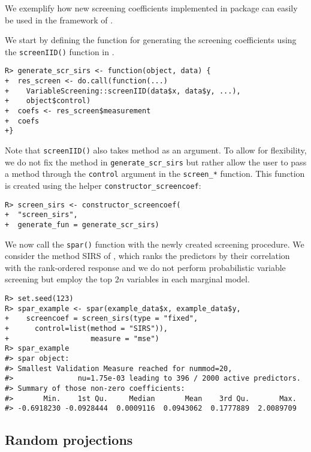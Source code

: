 \documentclass[
  article]{jss}
\begin{document}
We exemplify how new screening coefficients implemented in package
 can easily be used in the framework of
.

We start by defining the function for generating the screening
coefficients using the \texttt{screenIID()} function in
.

\begin{verbatim}
R> generate_scr_sirs <- function(object, data) {
+  res_screen <- do.call(function(...) 
+    VariableScreening::screenIID(data$x, data$y, ...), 
+    object$control)
+  coefs <- res_screen$measurement
+  coefs
+}
\end{verbatim}

Note that \texttt{screenIID()} also takes method as an argument. To
allow for flexibility, we do not fix the method in
\texttt{generate\_scr\_sirs} but rather allow the user to pass a method
through the \texttt{control} argument in the \texttt{screen\_*}
function. This function is created using the helper
\texttt{constructor\_screencoef}:

\begin{verbatim}
R> screen_sirs <- constructor_screencoef(
+  "screen_sirs", 
+  generate_fun = generate_scr_sirs)
\end{verbatim}

We now call the \texttt{spar()} function with the newly created
screening procedure. We consider the method SIRS of
\citet{zhu2011model}, which ranks the predictors by their correlation
with the rank-ordered response and we do not perform probabilistic
variable screening but employ the top \(2n\) variables in each marginal
model.

\begin{verbatim}
R> set.seed(123)      
R> spar_example <- spar(example_data$x, example_data$y,
+    screencoef = screen_sirs(type = "fixed",
+      control=list(method = "SIRS")),
+                   measure = "mse")
R> spar_example
#> spar object:
#> Smallest Validation Measure reached for nummod=20,
#>               nu=1.75e-03 leading to 396 / 2000 active predictors.
#> Summary of those non-zero coefficients:
#>       Min.    1st Qu.     Median       Mean    3rd Qu.       Max. 
#> -0.6918230 -0.0928444  0.0009116  0.0943062  0.1777889  2.0089709
\end{verbatim}

\subsection{Random projections}\label{random-projections-1}
\end{document}
